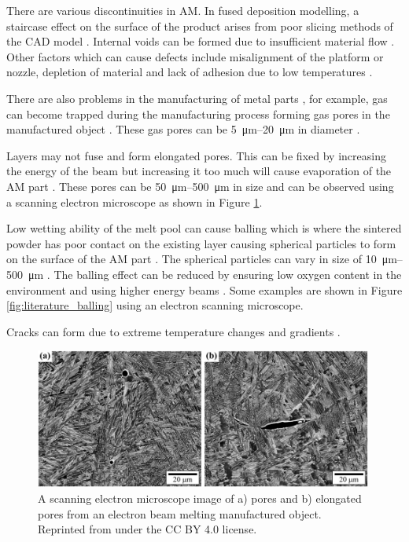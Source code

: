 There are various discontinuities in AM. In fused deposition modelling, a staircase effect on the surface of the product arises from poor slicing methods of the CAD model \citep{weeren1995quality}. Internal voids can be formed due to insufficient material flow \citep{weeren1995quality}. Other factors which can cause defects include misalignment of the platform or nozzle, depletion of material and lack of adhesion due to low temperatures \citep{gunaydin2018common}.

There are also problems in the manufacturing of metal parts \citep{everton2016review}, for example, gas can become trapped during the manufacturing process forming gas pores in the manufactured object \citep{thijs2010study, tammas2015xct}. These gas pores can be \SIrange{5}{20}{\micro\metre} in diameter \citep{everton2016review}.

Layers may not fuse and form elongated pores. This can be fixed by increasing the energy of the beam but increasing it too much will cause evaporation of the AM part \citep{mumtaz2008high}. These pores can be \SIrange{50}{500}{\micro\metre} in size \citep{everton2016review} and can be observed using a scanning electron microscope as shown in Figure \ref{fig:literature_pores}.

Low wetting ability of the melt pool can cause balling which is where the sintered powder has poor contact on the existing layer causing spherical particles to form on the surface of the AM part \citep{li2012balling, gu2009balling}. The spherical particles can vary in size of \SIrange{10}{500}{\micro\metre} \citep{li2012balling}. The balling effect can be reduced by ensuring low oxygen content in the environment \citep{niu1999instability} and using higher energy beams \citep{gu2009balling}. Some examples are shown in Figure \ref{fig:literature_balling} using an electron scanning microscope.

Cracks can form due to extreme temperature changes and gradients \citep{mercelis2006residual, zaeh2010investigations}.

\begin{figure}
  \centering
  \includegraphics[width=0.99\textwidth]{../figures/literatureReview/literature_pores.png}
  \caption{A scanning electron microscope image of a) pores and b) elongated pores from an electron beam melting manufactured object. Reprinted from \cite{tammas2015xct} under the CC BY 4.0 license.}
  \label{fig:literature_pores}
\end{figure}

